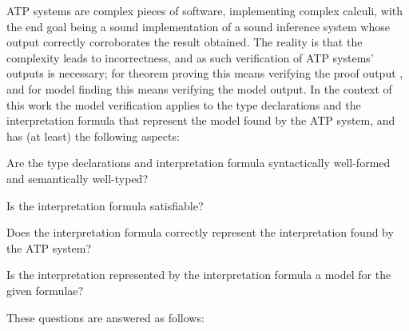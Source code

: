 \documentclass[letterpaper]{article}
\newenvironment{packed_enumerate}{
\vspace*{-0.2em}
\begin{enumerate}
\setlength{\partopsep}{0pt}
\setlength{\itemsep}{1pt}
\setlength{\parskip}{0pt}
\setlength{\parsep}{0pt}
}{\end{enumerate}}
\begin{document}
ATP systems are complex pieces of software, implementing complex calculi, with the end goal
being a sound implementation of a sound inference system whose output correctly corroborates the
result obtained.
The reality is that the complexity leads to incorrectness, and as such verification of ATP systems'
outputs is necessary; for theorem proving this means verifying the proof output \cite{Sut06},
and for model finding this means verifying the model output.
In the context of this work the model verification applies to the type declarations and 
the interpretation formula that represent the model found by the ATP system, and
has (at least) the following aspects:
\begin{packed_enumerate}
\item Are the type declarations and interpretation formula syntactically well-formed 
      and semantically well-typed?
\item Is the interpretation formula satisfiable?
\item Does the interpretation formula correctly represent the interpretation found by the 
      ATP system?
\item Is the interpretation represented by the interpretation formula a model for the given 
      formulae?
\end{packed_enumerate}
\noindent
These questions are answered as follows:
\end{document}
